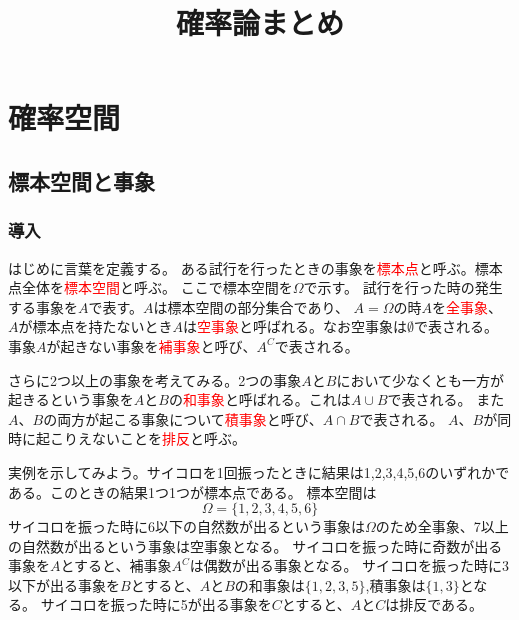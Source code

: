 \documentclass[a4paper,10pt]{jarticle}
\begin{document}
\title{確率論まとめ}
\maketitle
\section{確率空間}
\subsection{標本空間と事象}
\subsubsection{導入}
はじめに言葉を定義する。
ある試行を行ったときの事象を\textcolor{red}{標本点}と呼ぶ。標本点全体を\textcolor{red}{標本空間}と呼ぶ。
ここで標本空間を$\Omega$で示す。
試行を行った時の発生する事象を$A$で表す。$A$は標本空間の部分集合であり、
$A=\Omega$の時$A$を\textcolor{red}{全事象}、$A$が標本点を持たないとき$A$は\textcolor{red}{空事象}と呼ばれる。なお空事象は$\emptyset$で表される。
事象$A$が起きない事象を\textcolor{red}{補事象}と呼び、$A^C$で表される。

さらに2つ以上の事象を考えてみる。2つの事象$A$と$B$において少なくとも一方が起きるという事象を$A$と$B$の\textcolor{red}{和事象}と呼ばれる。これは$A\cup B$で表される。
また$A$、$B$の両方が起こる事象について\textcolor{red}{積事象}と呼び、$A\cap B$で表される。
$A$、$B$が同時に起こりえないことを\textcolor{red}{排反}と呼ぶ。

実例を示してみよう。サイコロを1回振ったときに結果は1,2,3,4,5,6のいずれかである。このときの結果1つ1つが標本点である。
標本空間は
\begin{equation}
    \Omega = \{1,2,3,4,5,6\}\tag{1,1}
\end{equation}
サイコロを振った時に6以下の自然数が出るという事象は$\Omega$のため全事象、7以上の自然数が出るという事象は空事象となる。
サイコロを振った時に奇数が出る事象を$A$とすると、補事象$A^C$は偶数が出る事象となる。
サイコロを振った時に3以下が出る事象を$B$とすると、$A$と$B$の和事象は$\{1,2,3,5\}$,積事象は$\{1,3\}$となる。
サイコロを振った時に5が出る事象を$C$とすると、$A$と$C$は排反である。
\end{document}

